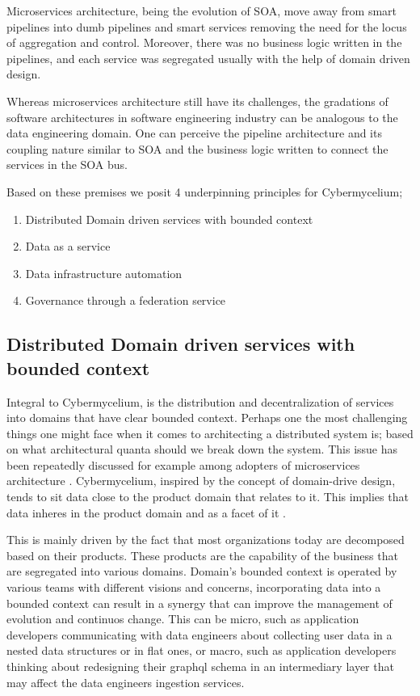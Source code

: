 \documentclass[review]{elsarticle}
\begin{document}
Microservices architecture, being the evolution of SOA, move away from smart pipelines into dumb pipelines and smart services removing the need for the locus of aggregation and control. Moreover, there was no business logic written in the pipelines, and each service was segregated usually with the help of domain driven design. 

Whereas microservices architecture still have its challenges, the gradations of software architectures in software engineering industry can be analogous to the data engineering domain. One can perceive the pipeline architecture and its coupling nature similar to SOA and the business logic written to connect the services in the SOA bus. 

Based on these premises we posit 4 underpinning principles for Cybermycelium; 

\begin{enumerate}
    \item Distributed Domain driven services with bounded context
    \item Data as a service
    \item Data infrastructure automation
    \item Governance through a federation service 

\end{enumerate}

\subsection{Distributed Domain driven services with bounded context}

Integral to Cybermycelium, is the distribution and decentralization of services into domains that have clear bounded context. Perhaps one the most challenging things one might face when it comes to architecting a distributed system is; based on what architectural quanta should we break down the system. This issue has been repeatedly discussed for example among adopters of microservices architecture . Cybermycelium, inspired by the concept of domain-drive design, tends to sit data close to the product domain that relates to it. This implies that data inheres in the product domain and as a facet of it \cite{laigner2021data}.

This is mainly driven by the fact that most organizations today are decomposed based on their products. These products are the capability of the business that are segregated into various domains. Domain's bounded context is operated by various teams with different visions and concerns, incorporating data into a bounded context can result in a synergy that can improve the management of evolution and continuos change. This can be micro, such as application developers communicating with data engineers about collecting user data in a nested data structures or in flat ones, or macro, such as application developers thinking about redesigning their graphql schema in an intermediary layer that may affect the data engineers ingestion services. 
\end{document}
